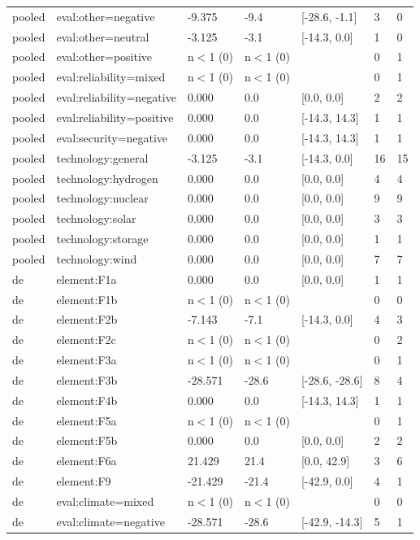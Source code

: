\begin{table}[htbp]
\begin{tabular}{lllllll}
pooled & eval:other=negative & -9.375 & -9.4 & [-28.6, -1.1] & 3 & 0 \\
pooled & eval:other=neutral & -3.125 & -3.1 & [-14.3, 0.0] & 1 & 0 \\
pooled & eval:other=positive & n$<$1 (0) & n$<$1 (0) &  & 0 & 1 \\
pooled & eval:reliability=mixed & n$<$1 (0) & n$<$1 (0) &  & 0 & 1 \\
pooled & eval:reliability=negative & 0.000 & 0.0 & [0.0, 0.0] & 2 & 2 \\
pooled & eval:reliability=positive & 0.000 & 0.0 & [-14.3, 14.3] & 1 & 1 \\
pooled & eval:security=negative & 0.000 & 0.0 & [-14.3, 14.3] & 1 & 1 \\
pooled & technology:general & -3.125 & -3.1 & [-14.3, 0.0] & 16 & 15 \\
pooled & technology:hydrogen & 0.000 & 0.0 & [0.0, 0.0] & 4 & 4 \\
pooled & technology:nuclear & 0.000 & 0.0 & [0.0, 0.0] & 9 & 9 \\
pooled & technology:solar & 0.000 & 0.0 & [0.0, 0.0] & 3 & 3 \\
pooled & technology:storage & 0.000 & 0.0 & [0.0, 0.0] & 1 & 1 \\
pooled & technology:wind & 0.000 & 0.0 & [0.0, 0.0] & 7 & 7 \\
de & element:F1a & 0.000 & 0.0 & [0.0, 0.0] & 1 & 1 \\
de & element:F1b & n$<$1 (0) & n$<$1 (0) &  & 0 & 0 \\
de & element:F2b & -7.143 & -7.1 & [-14.3, 0.0] & 4 & 3 \\
de & element:F2c & n$<$1 (0) & n$<$1 (0) &  & 0 & 2 \\
de & element:F3a & n$<$1 (0) & n$<$1 (0) &  & 0 & 1 \\
de & element:F3b & -28.571 & -28.6 & [-28.6, -28.6] & 8 & 4 \\
de & element:F4b & 0.000 & 0.0 & [-14.3, 14.3] & 1 & 1 \\
de & element:F5a & n$<$1 (0) & n$<$1 (0) &  & 0 & 1 \\
de & element:F5b & 0.000 & 0.0 & [0.0, 0.0] & 2 & 2 \\
de & element:F6a & 21.429 & 21.4 & [0.0, 42.9] & 3 & 6 \\
de & element:F9 & -21.429 & -21.4 & [-42.9, 0.0] & 4 & 1 \\
de & eval:climate=mixed & n$<$1 (0) & n$<$1 (0) &  & 0 & 0 \\
de & eval:climate=negative & -28.571 & -28.6 & [-42.9, -14.3] & 5 & 1 \\

\end{tabular}
\end{table}
